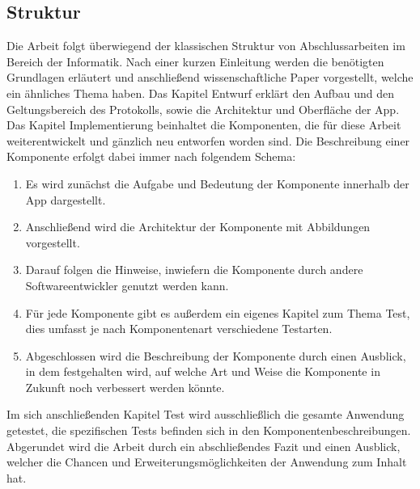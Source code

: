 \subsection{Struktur}
Die Arbeit folgt überwiegend der klassischen Struktur von Abschlussarbeiten im Bereich der Informatik. Nach einer kurzen Einleitung werden die benötigten Grundlagen erläutert und anschließend wissenschaftliche Paper vorgestellt, welche ein ähnliches Thema haben. Das Kapitel Entwurf erklärt den Aufbau und den Geltungsbereich des Protokolls, sowie die Architektur und Oberfläche der App. Das Kapitel Implementierung beinhaltet die Komponenten, die für diese Arbeit weiterentwickelt und gänzlich neu entworfen worden sind. Die Beschreibung einer Komponente erfolgt dabei immer nach folgendem Schema:\newline
\begin{enumerate}
	\item Es wird zunächst die Aufgabe und Bedeutung der Komponente innerhalb der App dargestellt.
	\item Anschließend wird die Architektur der Komponente mit Abbildungen vorgestellt.
	\item Darauf folgen die Hinweise, inwiefern die Komponente durch andere Softwareentwickler genutzt werden kann.
	\item Für jede Komponente gibt es außerdem ein eigenes Kapitel zum Thema Test, dies umfasst je nach Komponentenart verschiedene Testarten.
	\item Abgeschlossen wird die Beschreibung der Komponente durch einen Ausblick, in dem festgehalten wird, auf welche Art und Weise die Komponente in Zukunft noch verbessert werden könnte.\\
\end{enumerate}
Im sich anschließenden Kapitel Test wird ausschließlich die gesamte Anwendung getestet, die spezifischen Tests befinden sich in den Komponentenbeschreibungen. 
\newline Abgerundet wird die Arbeit durch ein abschließendes Fazit und einen Ausblick, welcher die Chancen und Erweiterungsmöglichkeiten der Anwendung zum Inhalt hat.
\newpage



